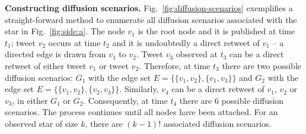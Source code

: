
\textbf{Constructing diffusion scenarios.}
Fig.~\ref{fig:diffusion-scenarios} exemplifies a straight-forward method to enumerate all diffusion scenarios associated with the star in Fig.~\ref{fig:side:a}.
The node $v_1$ is the root node and it is published at time $t_1$;
tweet $v_2$ occurs at time $t_2$ and it is undoubtedly a direct retweet of $v_1$ -- a directed edge is drawn from $v_1$ to $v_2$. 
Tweet $v_3$ observed at $t_3$ can be a direct retweet of either tweet $v_1$ or tweet $v_2$.
Therefore, at time $t_3$ there are two possible diffusion scenarios: 
$G_1$ with the edge set $E = \lbrace \{v_1, v_2\}, \{v_1, v_3\} \rbrace$ and $G_2$ with the edge set $E = \lbrace \{v_1, v_2\}, \{v_2, v_3\} \rbrace$.
Similarly, $v_4$ can be a direct retweet of $v_1$, $v_2$ or $v_3$, in either $G_1$ or $G_2$.
Consequently, at time $t_4$ there are 6 possible diffusion scenarios.
The process continues until all nodes have been attached.
For an observed star of size $k$, there are $(k-1)!$ associated diffusion scenarios.

